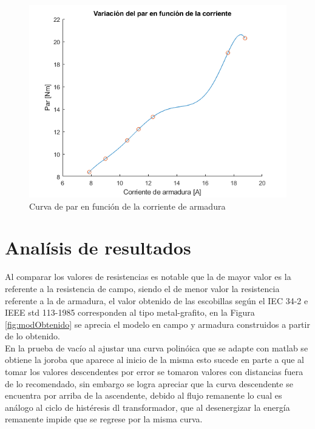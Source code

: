 \documentclass[11pt,letterpaper]{article}     %
\begin{document}
	\begin{figure}[H]
	\centering
	\includegraphics[scale=0.8]{./recursos-Lab6/curvaParCorrienteDeArmadura.png}
	\caption{Curva de par en función de la corriente de armadura}
	\label{fig:CurvaDeVelocidadCorriente}
\end{figure}
\section{Analísis de resultados}
Al comparar los valores de resistencias es notable que la de mayor valor es la referente a la resistencia de campo, siendo el de menor valor la resistencia referente a la de armadura, el valor obtenido de las escobillas según el IEC 34-2 e IEEE std 113-1985 corresponden al tipo metal-grafito, en la Figura \ref{fig:modObtenido} se aprecia el modelo en campo y armadura construidos a partir de lo obtenido.\\

En la prueba de vacío al ajustar una curva polinóica que se adapte con matlab se obtiene la joroba que aparece al inicio de la misma esto sucede en parte a que al tomar los valores descendentes por error se tomaron valores con distancias fuera de lo recomendado, sin embargo se logra apreciar que la curva descendente se encuentra por arriba de la ascendente, debido al flujo remanente lo cual es análogo al ciclo de histéresis dl transformador, que al desenergizar la energía remanente impide que se regrese por la misma curva.\\

    
\end{document}
